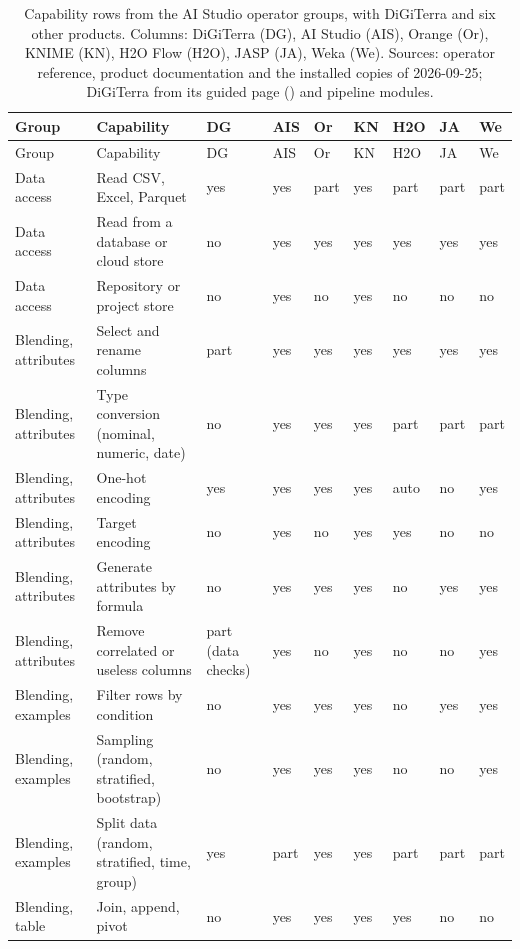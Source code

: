 {\small\setlength{\tabcolsep}{3pt}\begin{longtable}{@{}L{2.4cm}L{3.9cm}L{1.35cm}L{1.35cm}L{1.05cm}L{1.05cm}L{1.35cm}L{1.05cm}L{1.35cm}@{}}
\caption{Capability rows from the AI Studio operator groups, with DiGiTerra and six other products. Columns: DiGiTerra (DG), AI Studio (AIS), Orange (Or), KNIME (KN), H2O Flow (H2O), JASP (JA), Weka (We). Sources: operator reference, product documentation and the installed copies of 2026-09-25; DiGiTerra from its guided page () and pipeline modules.}\label{tab:coverage}\\
\toprule
Group & Capability & DG & AIS & Or & KN & H2O & JA & We \\
\midrule
\endfirsthead
\toprule
Group & Capability & DG & AIS & Or & KN & H2O & JA & We \\
\midrule
\endhead
Data access & Read CSV, Excel, Parquet & yes & yes & part & yes & part & part & part \\
Data access & Read from a database or cloud store & no & yes & yes & yes & yes & yes & yes \\
Data access & Repository or project store & no & yes & no & yes & no & no & no \\
Blending, attributes & Select and rename columns & part & yes & yes & yes & yes & yes & yes \\
Blending, attributes & Type conversion (nominal, numeric, date) & no & yes & yes & yes & part & part & part \\
Blending, attributes & One-hot encoding & yes & yes & yes & yes & auto & no & yes \\
Blending, attributes & Target encoding & no & yes & no & yes & yes & no & no \\
Blending, attributes & Generate attributes by formula & no & yes & yes & yes & no & yes & yes \\
Blending, attributes & Remove correlated or useless columns & part (data checks) & yes & no & yes & no & no & yes \\
Blending, examples & Filter rows by condition & no & yes & yes & yes & no & yes & yes \\
Blending, examples & Sampling (random, stratified, bootstrap) & no & yes & yes & yes & no & no & yes \\
Blending, examples & Split data (random, stratified, time, group) & yes & part & yes & yes & part & part & part \\
Blending, table & Join, append, pivot & no & yes & yes & yes & yes & no & no \\

\end{longtable}}
